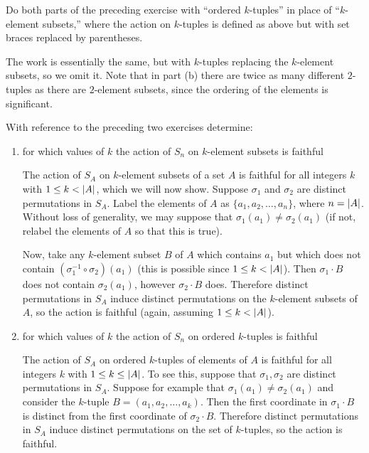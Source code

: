  Do both parts of the preceding exercise with ``ordered
$k$-tuples'' in place of ``$k$-element subsets,'' where the action on
$k$-tuples is defined as above but with set braces replaced by
parentheses.
\begin{solution}
  The work is essentially the same, but with $k$-tuples replacing the
  $k$-element subsets, so we omit it. Note that in part (b) there are
  twice as many different $2$-tuples as there are $2$-element subsets,
  since the ordering of the elements is significant.
\end{solution}

 With reference to the preceding two exercises determine:
\begin{enumerate}
\item for which values of $k$ the action of $S_n$ on $k$-element
  subsets is faithful
  \begin{solution}
    The action of $S_A$ on $k$-element subsets of a set $A$ is
    faithful for all integers $k$ with $1\leq k<\lvert{A}\rvert$, which we
    will now show. Suppose $\sigma_1$ and $\sigma_2$ are distinct
    permutations in $S_A$. Label the elements of $A$ as
    $\{a_1,a_2,\dots,a_n\}$, where $n = \lvert{A}\rvert$. Without loss of
    generality, we may suppose that $\sigma_1(a_1)\neq\sigma_2(a_1)$
    (if not, relabel the elements of $A$ so that this is true).

    Now, take any $k$-element subset $B$ of $A$ which contains $a_1$
    but which does not contain $(\sigma_1^{-1}\circ\sigma_2)(a_1)$
    (this is possible since $1\leq k<\lvert{A}\rvert$). Then $\sigma_1\cdot B$
    does not contain $\sigma_2(a_1)$, however $\sigma_2\cdot B$
    does. Therefore distinct permutations in $S_A$ induce distinct
    permutations on the $k$-element subsets of $A$, so the action is
    faithful (again, assuming $1\leq k<\lvert{A}\rvert$).
  \end{solution}

\item for which values of $k$ the action of $S_n$ on ordered
  $k$-tuples is faithful
  \begin{solution}
    The action of $S_A$ on ordered $k$-tuples of elements of $A$ is
    faithful for all integers $k$ with $1\leq k\leq\lvert{A}\rvert$. To see
    this, suppose that $\sigma_1,\sigma_2$ are distinct permutations
    in $S_A$. Suppose for example that
    $\sigma_1(a_1)\neq\sigma_2(a_1)$ and consider the $k$-tuple
    $B = (a_1, a_2, \dots, a_k)$. Then the first coordinate in
    $\sigma_1\cdot B$ is distinct from the first coordinate of
    $\sigma_2\cdot B$. Therefore distinct permutations in $S_A$ induce
    distinct permutations on the set of $k$-tuples, so the action is
    faithful.
  \end{solution}
\end{enumerate}

